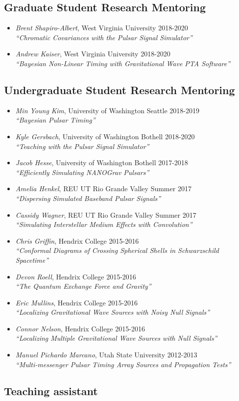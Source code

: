 \documentclass[11pt,letterpaper,sans,unicode]{moderncv}
\newcommand{\studentitem}[4]{\item \textit{#1}, {#2} \hfill{#3} \\ \textit{``#4''} } %
\newcommand{\blucirc}{{\color{color1} $\circ\;\;$}}
\begin{document}
\subsection{Graduate Student Research Mentoring}
\renewcommand\labelitemi{\blucirc}
\begin{itemize}[leftmargin=8mm]
	\studentitem{Brent Shapiro-Albert}{West Virginia University}{2018-2020}{Chromatic Covariances with the Pulsar Signal Simulator}
	\studentitem{Andrew Kaiser}{West Virginia University}{2018-2020}{Bayesian Non-Linear Timing with Gravitational Wave PTA Software}

\end{itemize}


\subsection{Undergraduate Student Research Mentoring}
\renewcommand\labelitemi{\blucirc}
\begin{itemize}[leftmargin=8mm]
	\studentitem{Min Young Kim}{University of Washington Seattle}{2018-2019}{Bayesian Pulsar Timing}
	\studentitem{Kyle Gersbach}{University of Washington Bothell}{2018-2020}{Teaching with the Pulsar Signal Simulator}
	\studentitem{Jacob Hesse}{University of Washington Bothell}{2017-2018}{Efficiently Simulating NANOGrav Pulsars}
	\studentitem{Amelia Henkel}{REU UT Rio Grande Valley}{Summer 2017}{Dispersing Simulated Baseband Pulsar Signals}
	\studentitem{Cassidy Wagner}{REU UT Rio Grande Valley}{Summer 2017}{Simulating Interstellar Medium Effects with Convolution}
       	 \studentitem{Chris Griffin}{Hendrix College}{2015-2016}{Conformal Diagrams of Crossing Spherical Shells in Schwarzschild Spacetime}
      	\studentitem{Devon Roell}{Hendrix College}{2015-2016}{The Quantum Exchange Force and Gravity}
	\studentitem{Eric Mullins}{Hendrix College}{2015-2016}{Localizing Gravitational Wave Sources with Noisy Null Signals}
	\studentitem{Connor Nelson}{Hendrix College}{2015-2016}{Localizing Multiple Gravitational Wave Sources with Null Signals}
        	\studentitem{Manuel Pichardo Marcano}{Utah State University}{2012-2013}{Multi-messenger Pulsar Timing Array Sources and Propagation Tests}
\end{itemize}

\subsection{Teaching assistant}
\end{document}

